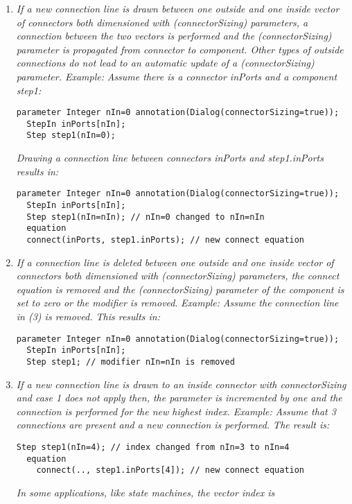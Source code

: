 \begin{enumerate}
\item
  \emph{If a new connection line is drawn between one outside and one
  inside vector of connectors both dimensioned with (connectorSizing)
  parameters, a connection between the two vectors is performed and the
  (connectorSizing) parameter is propagated from connector to component.
  Other types of outside connections do not lead to an automatic update
  of a (connectorSizing) parameter. Example:} \emph{Assume there is a
  connector inPorts and a component step1:}
\begin{lstlisting}[language=modelica]
  parameter Integer nIn=0 annotation(Dialog(connectorSizing=true));
  StepIn inPorts[nIn];
  Step step1(nIn=0);
\end{lstlisting}
  \emph{Drawing a connection line between connectors inPorts and
  step1.inPorts results in:}
\begin{lstlisting}[language=modelica]
  parameter Integer nIn=0 annotation(Dialog(connectorSizing=true));
  StepIn inPorts[nIn];
  Step step1(nIn=nIn); // nIn=0 changed to nIn=nIn
  equation
  connect(inPorts, step1.inPorts); // new connect equation
\end{lstlisting}
\item
  \emph{If a connection line is deleted between one outside and one
  inside vector of connectors both dimensioned with (connectorSizing)
  parameters, the connect equation is removed and the (connectorSizing)
  parameter of the component is set to zero or the modifier is removed}.
  \emph{Example:} \emph{Assume the connection line in (3) is removed.
  This results in:}
\begin{lstlisting}[language=modelica]
  parameter Integer nIn=0 annotation(Dialog(connectorSizing=true));
  StepIn inPorts[nIn];
  Step step1; // modifier nIn=nIn is removed
\end{lstlisting}
\item
  \emph{If a new connection line is drawn to an inside connector with
  connectorSizing and case 1 does not apply then, the parameter is
  incremented by one and the connection is performed for the new highest
  index. Example:} \emph{Assume that 3 connections are present and a new
  connection is performed. The result is:}
\begin{lstlisting}[language=modelica]
    Step step1(nIn=4); // index changed from nIn=3 to nIn=4
  equation
    connect(.., step1.inPorts[4]); // new connect equation
\end{lstlisting}
  \emph{In some applications, like state machines, the vector index is
}
\end{enumerate}
